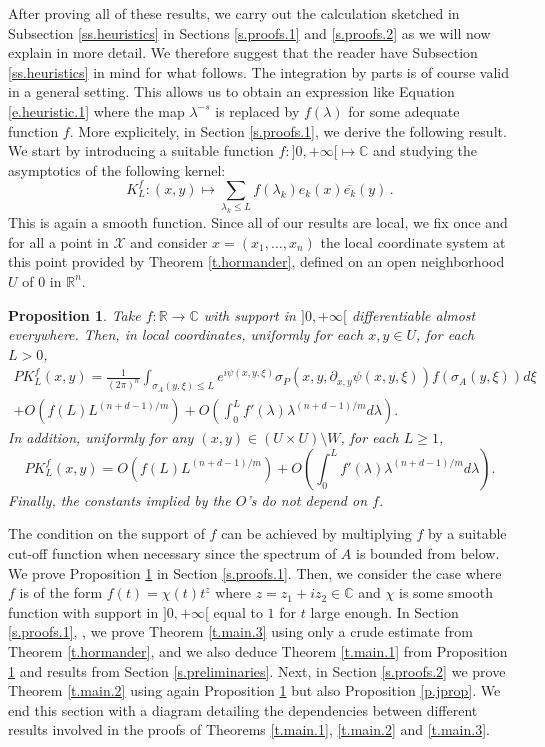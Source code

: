\documentclass[10pt,twoside]{article}
\newcommand{\R}{\mathbb{R}}
\newcommand{\C}{\mathbb{C}}
\newcommand{\pfty}{+\infty}
\newcommand{\man}{\mathcal{X}}
\numberwithin{theorem}{section}
\newtheorem{proposition}[theorem]{Proposition}
\begin{document}
After proving all of these results, we carry out the calculation sketched in Subsection \ref{ss.heuristics} in Sections \ref{s.proofs.1} and \ref{s.proofs.2} as we will now explain in more detail. We therefore suggest that the reader have Subsection \ref{ss.heuristics} in mind for what follows. The integration by parts is of course valid in a general setting. This allows us to obtain an expression like Equation \eqref{e.heuristic.1} where the map $\lambda^{-s}$ is replaced by $f(\lambda)$ for some adequate function $f$. More explicitely, in Section \ref{s.proofs.1}, we derive the following result. We start by introducing a suitable function $f:]0,+\infty[\mapsto\C$ and studying the asymptotics of the following kernel:
\[
K_L^f:(x,y)\mapsto\sum_{\lambda_k\leq L}f(\lambda_k)e_k(x)\overline{e_k}(y)\, .
\]
This is again a smooth function. Since all of our results are local, we fix once and for all a point in $\man$ and consider $x=(x_1,\dots,x_n)$ the local coordinate system at this point provided by Theorem \ref{t.hormander}, defined on an open neighborhood $U$ of $0$ in $\R^n$.
\begin{proposition}\label{p.main}
Take $f:\R\rightarrow \C$ with support in $]0,+\infty[$ differentiable almost everywhere. Then, in local coordinates, uniformly for each  $x,y\in U$, for each $L>0$,
\begin{multline*}
PK_L^f(x,y)=\frac{1}{(2\pi)^n}\int_{\sigma_A(y,\xi)\leq L}e^{i\psi(x,y,\xi)}\sigma_P(x,y,\partial_{x,y}\psi(x,y,\xi))f(\sigma_A(y,\xi))d\xi\\
+O\left(f(L)L^{(n+d-1)/m}\right)+O\left(\int_0^Lf'(\lambda)\lambda^{(n+d-1)/m}d\lambda\right).
\end{multline*}
In addition, uniformly for any $(x,y)\in \left(U\times U\right)\setminus W$, for each $L\geq 1$,
\[
PK_L^f(x,y)=O\left(f(L)L^{(n+d-1)/m}\right)+O\left(\int_0^Lf'(\lambda)\lambda^{(n+d-1)/m}d\lambda\right).
\]
Finally, the constants implied by the $O$'s do not depend on $f$. 
\end{proposition}
The condition on the support of $f$ can be achieved by multiplying $f$ by a suitable cut-off function when necessary since the spectrum of $A$ is bounded from below. We prove Proposition \ref{p.main} in Section \ref{s.proofs.1}. Then, we consider the case where $f$ is of the form $f(t)=\chi(t)t^z$ where $z=z_1+iz_2\in\C$ and $\chi$ is some smooth function with support in $]0,\pfty[$ equal to $1$ for $t$ large enough. In Section \ref{s.proofs.1}, , we prove Theorem \ref{t.main.3} using only a crude estimate from Theorem \ref{t.hormander}, and  we also deduce Theorem \ref{t.main.1} from Proposition \ref{p.main} and results from Section \ref{s.preliminaries}. Next, in Section \ref{s.proofs.2} we prove Theorem \ref{t.main.2} using again Proposition \ref{p.main} but also Proposition \ref{p.jprop}. We end this section with a diagram detailing the dependencies between different results involved in the proofs of Theorems \ref{t.main.1}, \ref{t.main.2} and \ref{t.main.3}.
\end{document}
